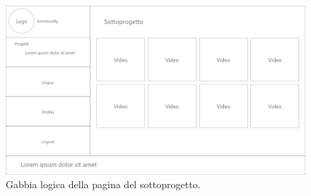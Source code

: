 \begin{figure}[H]
	\centering
	\caption{Gabbia logica della pagina del sottoprogetto.}
	\label{fig:gabbie-logiche:sottoprogetto}
	\includegraphics[width=\textwidth]{images/gabbie-logiche/Sottoprogetto}
\end{figure}
